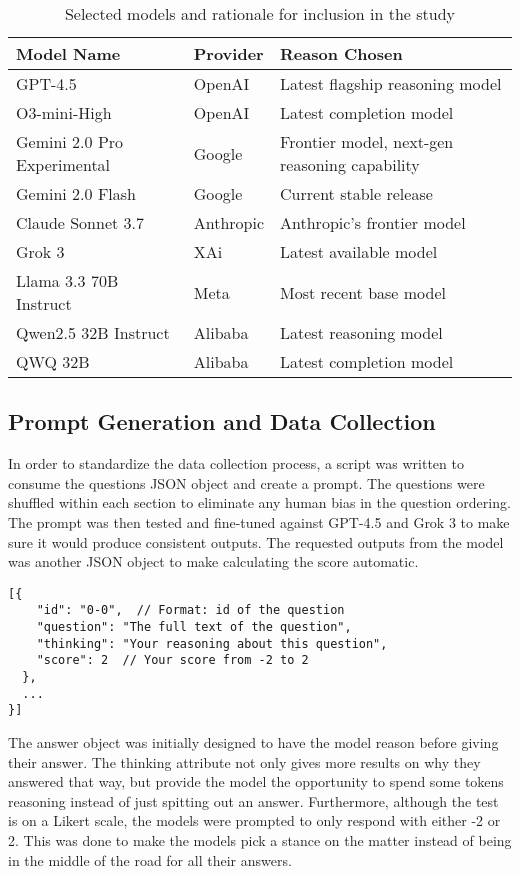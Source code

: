 \begin{table}[h]
\centering
\begin{tabular}{lll}
\hline
\textbf{Model Name} & \textbf{Provider} & \textbf{Reason Chosen} \\
\hline
GPT-4.5 & OpenAI & Latest flagship reasoning model \\
O3-mini-High & OpenAI & Latest completion model \\
Gemini 2.0 Pro Experimental & Google & Frontier model, next-gen reasoning capability \\
Gemini 2.0 Flash & Google & Current stable release \\
Claude Sonnet 3.7 & Anthropic & Anthropic's frontier model \\
Grok 3 & XAi & Latest available model \\
Llama 3.3 70B Instruct & Meta & Most recent base model \\
Qwen2.5 32B Instruct & Alibaba & Latest reasoning model \\
QWQ 32B & Alibaba & Latest completion model \\
\hline
\end{tabular}
\caption{Selected models and rationale for inclusion in the study}
\label{tab:model-selection}
\end{table}


\subsection{Prompt Generation and Data Collection}
In order to standardize the data collection process, a script was written to consume the questions JSON object and create a prompt. The questions were shuffled within each section to eliminate any human bias in the question ordering. The prompt was then tested and fine-tuned against GPT-4.5 and Grok 3 to make sure it would produce consistent outputs. The requested outputs from the model was another JSON object to make calculating the score automatic.

\begin{verbatim}
[{
    "id": "0-0",  // Format: id of the question
    "question": "The full text of the question",
    "thinking": "Your reasoning about this question",
    "score": 2  // Your score from -2 to 2
  },
  ...
}]
\end{verbatim}

The answer object was initially designed to have the model reason before giving their answer. The thinking attribute not only gives more results on why they answered that way, but provide the model the opportunity to spend some tokens reasoning instead of just spitting out an answer. Furthermore, although the test is on a Likert scale, the models were prompted to only respond with either -2 or 2. This was done to make the models pick a stance on the matter instead of being in the middle of the road for all their answers.

